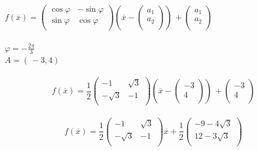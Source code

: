 \documentclass [a4paper,12pt]{article}
\begin{document}
\section{} %
%
$f({\overline{x}})= \left(
\begin{matrix}
\cos{\varphi} & -\sin{\varphi}\\
\sin{\varphi} & \cos{\varphi}\\
\end{matrix}
\right
)
\left ( {\overline{x}} -
\left(
\begin{matrix}
a_1\\
a_2\\
\end{matrix}
\right
)
\right ) \, +
\left(
\begin{matrix}
a_1\\
a_2\\
\end{matrix}
\right
)
$\\
\\
$\varphi = -\frac{2\pi}{3}$\\
$A=( \, -3, 4) \,$\\
\\
\begin{equation*} f({\overline{x}})= \frac{1}{2}\left(
\begin{matrix}
-1 & \sqrt{3}\\
-\sqrt{3} & -1\\
\end{matrix}
\right
)
\left ( {\overline{x}} -
\left(
\begin{matrix}
-3\\
4\\
\end{matrix}
\right
)
\right ) \, +
\left(
\begin{matrix}
-3\\
4\\
\end{matrix}
\right
)
\end{equation*}\\
\begin{equation*}
f({\overline{x}})= \frac{1}{2}\left(
\begin{matrix}
-1 & \sqrt{3}\\
-\sqrt{3} & -1\\
\end{matrix}
\right
)
{\overline{x}} + \frac{1}{2}
\left(
\begin{matrix}
-9 - 4\sqrt{3}\\
12 - 3\sqrt{3}\\
\end{matrix}
\right
)
\end{equation*}
\end{document}
